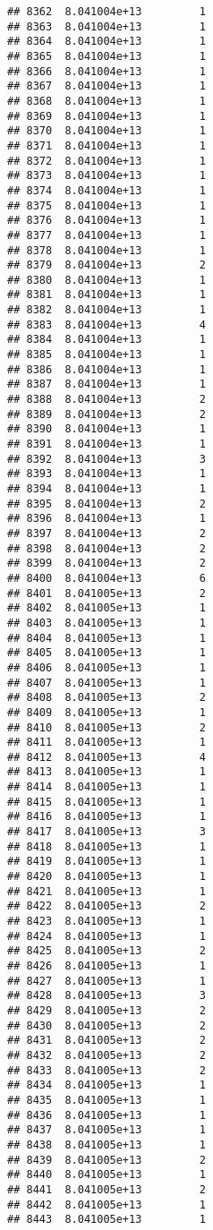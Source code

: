\documentclass[
]{article}
\begin{document}
\begin{verbatim}
## 8362  8.041004e+13         1
## 8363  8.041004e+13         1
## 8364  8.041004e+13         1
## 8365  8.041004e+13         1
## 8366  8.041004e+13         1
## 8367  8.041004e+13         1
## 8368  8.041004e+13         1
## 8369  8.041004e+13         1
## 8370  8.041004e+13         1
## 8371  8.041004e+13         1
## 8372  8.041004e+13         1
## 8373  8.041004e+13         1
## 8374  8.041004e+13         1
## 8375  8.041004e+13         1
## 8376  8.041004e+13         1
## 8377  8.041004e+13         1
## 8378  8.041004e+13         1
## 8379  8.041004e+13         2
## 8380  8.041004e+13         1
## 8381  8.041004e+13         1
## 8382  8.041004e+13         1
## 8383  8.041004e+13         4
## 8384  8.041004e+13         1
## 8385  8.041004e+13         1
## 8386  8.041004e+13         1
## 8387  8.041004e+13         1
## 8388  8.041004e+13         2
## 8389  8.041004e+13         2
## 8390  8.041004e+13         1
## 8391  8.041004e+13         1
## 8392  8.041004e+13         3
## 8393  8.041004e+13         1
## 8394  8.041004e+13         1
## 8395  8.041004e+13         2
## 8396  8.041004e+13         1
## 8397  8.041004e+13         2
## 8398  8.041004e+13         2
## 8399  8.041004e+13         2
## 8400  8.041004e+13         6
## 8401  8.041005e+13         2
## 8402  8.041005e+13         1
## 8403  8.041005e+13         1
## 8404  8.041005e+13         1
## 8405  8.041005e+13         1
## 8406  8.041005e+13         1
## 8407  8.041005e+13         1
## 8408  8.041005e+13         2
## 8409  8.041005e+13         1
## 8410  8.041005e+13         2
## 8411  8.041005e+13         1
## 8412  8.041005e+13         4
## 8413  8.041005e+13         1
## 8414  8.041005e+13         1
## 8415  8.041005e+13         1
## 8416  8.041005e+13         1
## 8417  8.041005e+13         3
## 8418  8.041005e+13         1
## 8419  8.041005e+13         1
## 8420  8.041005e+13         1
## 8421  8.041005e+13         1
## 8422  8.041005e+13         2
## 8423  8.041005e+13         1
## 8424  8.041005e+13         1
## 8425  8.041005e+13         2
## 8426  8.041005e+13         1
## 8427  8.041005e+13         1
## 8428  8.041005e+13         3
## 8429  8.041005e+13         2
## 8430  8.041005e+13         2
## 8431  8.041005e+13         2
## 8432  8.041005e+13         2
## 8433  8.041005e+13         2
## 8434  8.041005e+13         1
## 8435  8.041005e+13         1
## 8436  8.041005e+13         1
## 8437  8.041005e+13         1
## 8438  8.041005e+13         1
## 8439  8.041005e+13         2
## 8440  8.041005e+13         1
## 8441  8.041005e+13         2
## 8442  8.041005e+13         1
## 8443  8.041005e+13         1

\end{verbatim}
\end{document}
